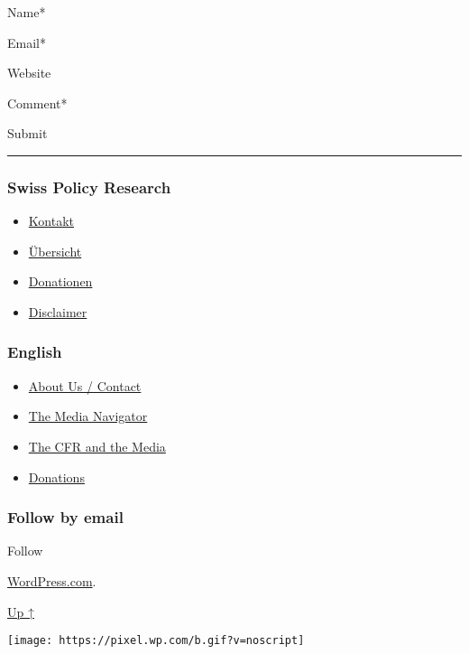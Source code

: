 Name*

Email*

Website

Comment*

Submit

\begin{center}\rule{0.5\linewidth}{\linethickness}\end{center}

\hypertarget{swiss-policy-research}{%
\subsubsection{Swiss Policy Research}\label{swiss-policy-research}}

\begin{itemize}
\tightlist
\item
  \href{https://swprs.org/kontakt/}{Kontakt}
\item
  \href{https://swprs.org/uebersicht/}{Übersicht}
\item
  \href{https://swprs.org/donationen/}{Donationen}
\item
  \href{https://swprs.org/disclaimer/}{Disclaimer}
\end{itemize}

\hypertarget{english}{%
\subsubsection{English}\label{english}}

\begin{itemize}
\tightlist
\item
  \href{https://swprs.org/contact/}{About Us / Contact}
\item
  \href{https://swprs.org/media-navigator/}{The Media Navigator}
\item
  \href{https://swprs.org/the-american-empire-and-its-media/}{The CFR
  and the Media}
\item
  \href{https://swprs.org/donations/}{Donations}
\end{itemize}

\hypertarget{follow-by-email}{%
\subsubsection{Follow by email}\label{follow-by-email}}

Follow

\href{https://wordpress.com/?ref=footer_custom_com}{WordPress.com}.

\protect\hyperlink{}{Up ↑}

\texttt{[image: https://pixel.wp.com/b.gif?v=noscript]}
